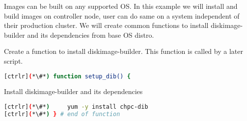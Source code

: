 
	Images can be built on any supported OS. In this example we will install and build images on controller node, user can do same on a system independent of their production cluster. We will create common functions to install diskimage-builder and its dependencies from base OS distro.

	Create a function to install diskimage-builder. This function is called by a later script. 

\begin{lstlisting}[language=bash,keywords={}]
[ctrlr](*\#*) function setup_dib() {
\end{lstlisting}
	Install diskimage-builder and its dependencies
\begin{lstlisting}[language=bash,keywords={}]
[ctrlr](*\#*)     yum -y install chpc-dib
[ctrlr](*\#*) } # end of function
\end{lstlisting}
